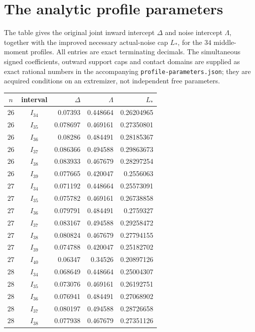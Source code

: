 \section{The analytic profile parameters}\label{app:parameters}
The table gives the original joint inward intercept $\Delta$ and
noise intercept $\Lambda$, together with the improved necessary
actual-noise cap $L_*$, for the $34$ middle-moment profiles.
All entries are exact terminating decimals. The simultaneous
signed coefficients, outward support caps and contact domains
are supplied as exact rational numbers in the accompanying
\texttt{profile-parameters.json}; they are acquired conditions
on an extremizer, not independent free parameters.
\begingroup\small
\begin{longtable}{ccrrr}\toprule
$n$ & interval & $\Delta$ & $\Lambda$ & $L_*$\\\midrule\endhead
$26$ & $I_{34}$ & 0.07393 & 0.448664 & 0.26204965\\
$26$ & $I_{35}$ & 0.078697 & 0.469161 & 0.27350801\\
$26$ & $I_{36}$ & 0.08286 & 0.484491 & 0.28185367\\
$26$ & $I_{37}$ & 0.086366 & 0.494588 & 0.29863673\\
$26$ & $I_{38}$ & 0.083933 & 0.467679 & 0.28297254\\
$26$ & $I_{39}$ & 0.077665 & 0.420047 & 0.2556063\\
\addlinespace
$27$ & $I_{34}$ & 0.071192 & 0.448664 & 0.25573091\\
$27$ & $I_{35}$ & 0.075782 & 0.469161 & 0.26738858\\
$27$ & $I_{36}$ & 0.079791 & 0.484491 & 0.2759327\\
$27$ & $I_{37}$ & 0.083167 & 0.494588 & 0.29258472\\
$27$ & $I_{38}$ & 0.080824 & 0.467679 & 0.27794155\\
$27$ & $I_{39}$ & 0.074788 & 0.420047 & 0.25182702\\
$27$ & $I_{40}$ & 0.06347 & 0.34526 & 0.20897126\\
\addlinespace
$28$ & $I_{34}$ & 0.068649 & 0.448664 & 0.25004307\\
$28$ & $I_{35}$ & 0.073076 & 0.469161 & 0.26192751\\
$28$ & $I_{36}$ & 0.076941 & 0.484491 & 0.27068902\\
$28$ & $I_{37}$ & 0.080197 & 0.494588 & 0.28726658\\
$28$ & $I_{38}$ & 0.077938 & 0.467679 & 0.27351126\\

\end{longtable}

